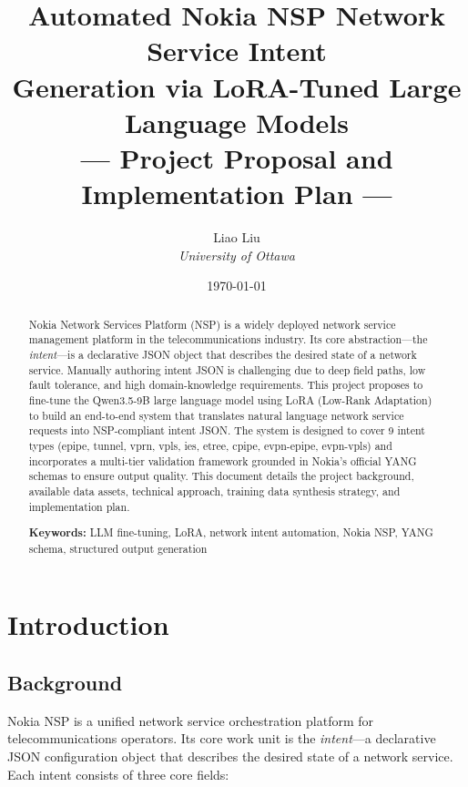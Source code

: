 \documentclass[12pt, a4paper]{article}
\title{%
  \vspace{-1cm}
  {\LARGE\bfseries Automated Nokia NSP Network Service Intent\\[4pt]
  Generation via LoRA-Tuned Large Language Models}\\[12pt]
  {\large --- Project Proposal and Implementation Plan ---}
}
\author{%
  Liao Liu \\[3pt]
  {\small\textit{University of Ottawa}}
}
\date{\today}
\newcommand{\yang}{\textsc{YANG}}
\newcommand{\nsp}{\textsc{NSP}}
\newcommand{\lora}{\textsc{LoRA}}
\begin{document}
\maketitle
\thispagestyle{empty}

\begin{abstract}
\noindent
Nokia Network Services Platform (\nsp{}) is a widely deployed network service management platform in the telecommunications industry. Its core abstraction---the \emph{intent}---is a declarative JSON object that describes the desired state of a network service. Manually authoring intent JSON is challenging due to deep field paths, low fault tolerance, and high domain-knowledge requirements. This project proposes to fine-tune the Qwen3.5-9B large language model using \lora{} (Low-Rank Adaptation) to build an end-to-end system that translates natural language network service requests into \nsp{}-compliant intent JSON. The system is designed to cover 9 intent types (epipe, tunnel, vprn, vpls, ies, etree, cpipe, evpn-epipe, evpn-vpls) and incorporates a multi-tier validation framework grounded in Nokia's official \yang{} schemas to ensure output quality. This document details the project background, available data assets, technical approach, training data synthesis strategy, and implementation plan.

\vspace{6pt}
\noindent\textbf{Keywords:} LLM fine-tuning, LoRA, network intent automation, Nokia NSP, YANG schema, structured output generation
\end{abstract}

\newpage
\tableofcontents
\newpage

\section{Introduction}

\subsection{Background}

Nokia \nsp{} is a unified network service orchestration platform for telecommunications operators. Its core work unit is the \emph{intent}---a declarative JSON configuration object that describes the desired state of a network service. Each intent consists of three core fields:
\end{document}
